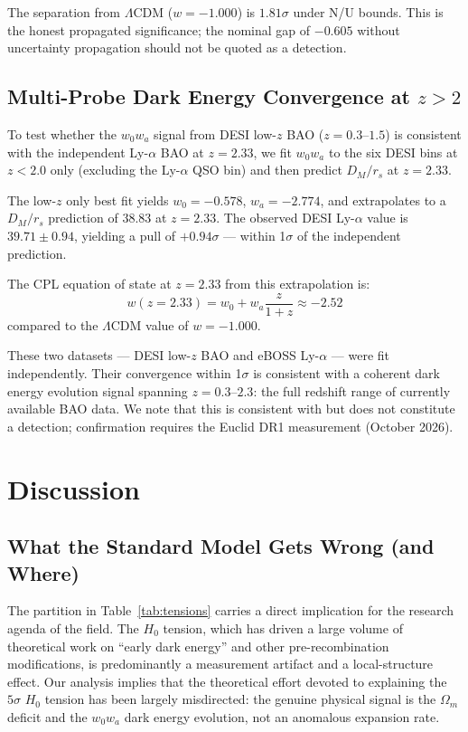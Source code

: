 \documentclass[twocolumn]{aastex631}
\begin{document}
The separation from $\Lambda$CDM ($w = -1.000$) is $1.81\sigma$ under N/U bounds.
This is the honest propagated significance; the nominal gap of $-0.605$ without
uncertainty propagation should not be quoted as a detection.

\subsection{Multi-Probe Dark Energy Convergence at $z > 2$}

To test whether the $w_0 w_a$ signal from DESI low-$z$ BAO ($z = 0.3$--$1.5$)
is consistent with the independent Ly-$\alpha$ BAO at $z = 2.33$, we fit
$w_0 w_a$ to the six DESI bins at $z < 2.0$ only (excluding the Ly-$\alpha$ QSO
bin) and then predict $D_M/r_s$ at $z = 2.33$.

The low-$z$ only best fit yields $w_0 = -0.578$, $w_a = -2.774$, and
extrapolates to a $D_M/r_s$ prediction of $38.83$ at $z = 2.33$.
The observed DESI Ly-$\alpha$ value is $39.71 \pm 0.94$, yielding a pull of
$+0.94\sigma$ --- within 1$\sigma$ of the independent prediction.

The CPL equation of state at $z = 2.33$ from this extrapolation is:
\begin{equation}
  w(z=2.33) = w_0 + w_a \frac{z}{1+z} \approx -2.52
\end{equation}
compared to the $\Lambda$CDM value of $w = -1.000$.

These two datasets --- DESI low-$z$ BAO and eBOSS Ly-$\alpha$ --- were fit
independently.
Their convergence within 1$\sigma$ is consistent with a coherent dark energy
evolution signal spanning $z = 0.3$--$2.3$: the full redshift range of
currently available BAO data.
We note that this is consistent with but does not constitute a detection;
confirmation requires the Euclid DR1 measurement (October 2026).


\section{Discussion}

\subsection{What the Standard Model Gets Wrong (and Where)}

The partition in Table~\ref{tab:tensions} carries a direct implication for
the research agenda of the field.
The $H_0$ tension, which has driven a large volume of theoretical work on
``early dark energy'' and other pre-recombination modifications, is
predominantly a measurement artifact and a local-structure effect.
Our analysis implies that the theoretical effort devoted to explaining the
$5\sigma$ $H_0$ tension has been largely misdirected: the genuine physical
signal is the $\Omega_m$ deficit and the $w_0 w_a$ dark energy evolution, not
an anomalous expansion rate.
\end{document}
